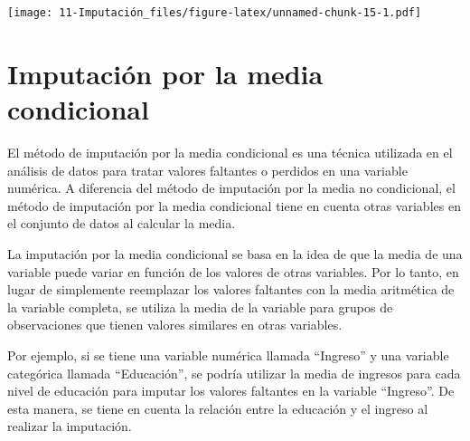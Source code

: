 \documentclass[
  12pt,
]{book}
\newenvironment{Shaded}{\begin{snugshade}}{\end{snugshade}}
\newcommand{\AttributeTok}[1]{\textcolor[rgb]{0.77,0.63,0.00}{#1}}
\newcommand{\FunctionTok}[1]{\textcolor[rgb]{0.00,0.00,0.00}{#1}}
\newcommand{\NormalTok}[1]{#1}
\newcommand{\OtherTok}[1]{\textcolor[rgb]{0.56,0.35,0.01}{#1}}
\newcommand{\SpecialCharTok}[1]{\textcolor[rgb]{0.00,0.00,0.00}{#1}}
\newcommand{\StringTok}[1]{\textcolor[rgb]{0.31,0.60,0.02}{#1}}
\begin{document}
\begin{Shaded}
\end{Shaded}

\texttt{[image: 11-Imputación\_files/figure-latex/unnamed-chunk-15-1.pdf]}

\hypertarget{imputaciuxf3n-por-la-media-condicional}{%
\section{Imputación por la media condicional}\label{imputaciuxf3n-por-la-media-condicional}}

El método de imputación por la media condicional es una técnica utilizada en el análisis de datos para tratar valores faltantes o perdidos en una variable numérica. A diferencia del método de imputación por la media no condicional, el método de imputación por la media condicional tiene en cuenta otras variables en el conjunto de datos al calcular la media.

La imputación por la media condicional se basa en la idea de que la media de una variable puede variar en función de los valores de otras variables. Por lo tanto, en lugar de simplemente reemplazar los valores faltantes con la media aritmética de la variable completa, se utiliza la media de la variable para grupos de observaciones que tienen valores similares en otras variables.

Por ejemplo, si se tiene una variable numérica llamada ``Ingreso'' y una variable categórica llamada ``Educación'', se podría utilizar la media de ingresos para cada nivel de educación para imputar los valores faltantes en la variable ``Ingreso''. De esta manera, se tiene en cuenta la relación entre la educación y el ingreso al realizar la imputación.
\end{document}
